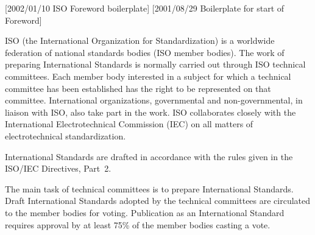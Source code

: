 [2002/01/10 ISO Foreword boilerplate]
[2001/08/29 Boilerplate for start of Foreword]

ISO (the International Organization for Standardization) is a worldwide
federation of national standards bodies (ISO member bodies). The work
of preparing International Standards is normally carried out through
ISO technical committees. Each member body interested in a subject for
which a technical committee has been established has the right to be
represented on that committee. International organizations,
governmental and non-governmental, in liaison with ISO, also take part
in the work. ISO collaborates closely with the International
Electrotechnical Commission (IEC) on all matters of electrotechnical
standardization.

International Standards are drafted in accordance with the rules given
in the ISO/IEC Directives, Part~2.

The main task of technical committees is to prepare International Standards.
Draft International Standards adopted by the technical committees are
circulated to the member bodies for voting. Publication as an
International Standard requires approval by at least 75\% of the member
bodies casting a vote.
\par

\endinput
